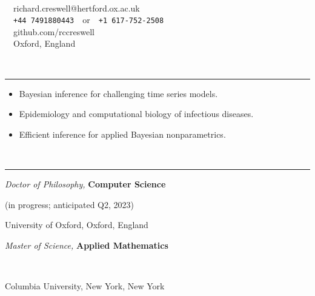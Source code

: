 \documentclass[11pt]{article}
\begin{document}
\noindent\parbox{.3\textwidth}{\LARGE \textbf{}}
\parbox{.3\textwidth}{~}
\parbox{.4\textwidth}{
\-\hspace{0cm}{\faEnvelopeO}~~richard.creswell@hertford.ox.ac.uk\\
\-\hspace{0cm}{\faWhatsapp}~~\texttt{\footnotesize +44 7491880443}~~or~~\texttt{\footnotesize +1 617-752-2508}\\
\-\hspace{0cm}{\faGithub}~~github.com/rccreswell\\
{ \faHome}~~Oxford, England
}

\vspace{0.6cm}

\vspace{-2.75mm} \\
\rule{\textwidth}{0.4pt}
\vspace{-7mm}
\begin{itemize}[leftmargin=*]
\setlength{\itemsep}{2pt}
\setlength{\parskip}{0pt}
\setlength{\parsep}{0pt}
\item Bayesian inference for challenging time series models.
\item Epidemiology and computational biology of infectious diseases.
\item Efficient inference for applied Bayesian nonparametrics.
\end{itemize}

 

\vspace{0.4cm}

\vspace{-2.75mm} \\
\rule{\textwidth}{0.4pt}
\vspace{0.1mm}
\noindent\parbox{.65\textwidth}{\raggedright \textit{{D}octor of Philosophy,} \textbf{Computer Science}}
\parbox{.35\textwidth}{\raggedleft (in progress; anticipated Q2, 2023)}
University of Oxford, Oxford, England

\vspace{0.4cm}

\noindent\parbox{.75\textwidth}{\raggedright \textit{Master of Science,} \textbf{Applied Mathematics}}
\parbox{.25\textwidth}{\raggedleft  ~}
Columbia University, New York, New York


\vspace{0.4cm}
\end{document}
